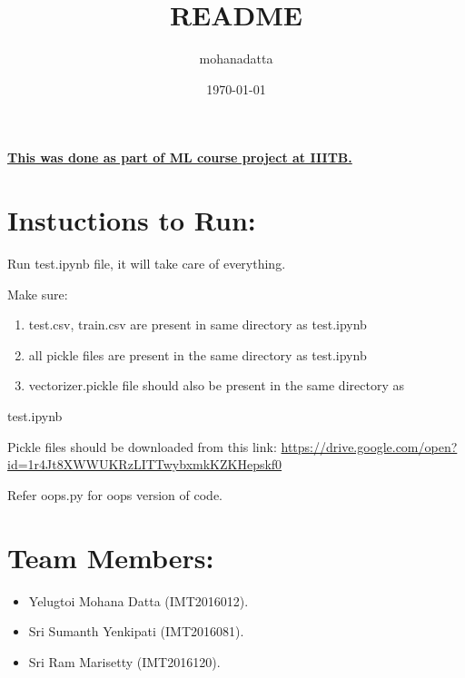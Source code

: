 \documentclass[11pt]{article}
\author{mohanadatta}
\date{\today}
\title{README}
\begin{document}
\maketitle
\textbf{\uline{This was done as part of ML course project at IIITB.}}

\section{Instuctions to Run:}
\label{sec-1}
Run test.ipynb file, it will take care of everything.


Make sure:

\begin{enumerate}
\item test.csv, train.csv are present in same directory as test.ipynb
\item all  pickle files are present in the same directory as test.ipynb
\item vectorizer.pickle file should also be present in the same directory as
\end{enumerate}
test.ipynb

Pickle files should be downloaded from this link: 
\url{https://drive.google.com/open?id=1r4Jt8XWWUKRzLITTwybxmkKZKHepskf0}

Refer oops.py for oops version of code.





\section{Team Members:}
\label{sec-2}
\begin{itemize}
\item Yelugtoi Mohana Datta (IMT2016012).
\item Sri Sumanth Yenkipati (IMT2016081).
\item Sri Ram Marisetty (IMT2016120).
\end{itemize}
\end{document}
